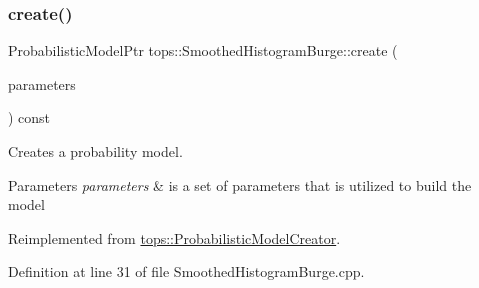 \subsubsection{\texorpdfstring{create()}{create()}}
{\footnotesize\ttfamily Probabilistic\+Model\+Ptr tops\+::\+Smoothed\+Histogram\+Burge\+::create (\begin{DoxyParamCaption}\item[{\hyperlink{classtops_1_1ProbabilisticModelParameters}{Probabilistic\+Model\+Parameters} \&}]{parameters }\end{DoxyParamCaption}) const\hspace{0.3cm}{\ttfamily [virtual]}}



Creates a probability model. 


\begin{DoxyParams}{Parameters}
{\em parameters} & is a set of parameters that is utilized to build the model \\
\hline
\end{DoxyParams}


Reimplemented from \hyperlink{classtops_1_1ProbabilisticModelCreator_afed6c8ffa45fff446bdaa8b533da8f7c}{tops\+::\+Probabilistic\+Model\+Creator}.



Definition at line 31 of file Smoothed\+Histogram\+Burge.\+cpp.


